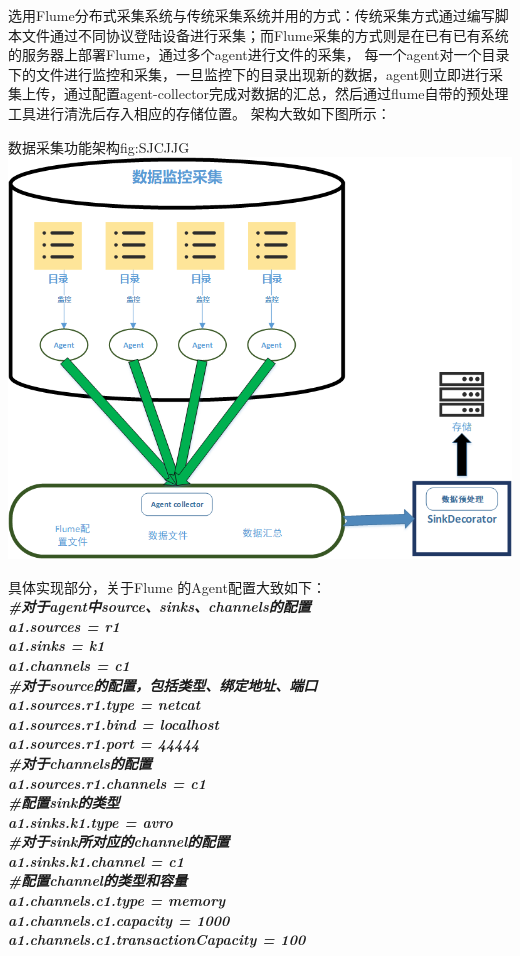 \documentclass{HustGraduPaper}
\begin{document}
    选用Flume分布式采集系统与传统采集系统并用的方式：传统采集方式通过编写脚本文件通过不同协议登陆设备进行采集；而Flume采集的方式则是在已有已有系统的服务器上部署Flume，通过多个agent进行文件的采集，
    每一个agent对一个目录下的文件进行监控和采集，一旦监控下的目录出现新的数据，agent则立即进行采集上传，通过配置agent-collector完成对数据的汇总，然后通过flume自带的预处理工具进行清洗后存入相应的存储位置。
    架构大致如下图所示：
    \clearpage
    \begin{generalfig}{数据采集功能架构}{fig:SJCJJG} 
        \includegraphics[scale = 0.7]{Figures/SJCJJG.png} 
    \end{generalfig}

    具体实现部分，关于Flume 的Agent配置大致如下：\\
    {\songti \bfseries \itshape
    \#对于agent中source、sinks、channels的配置\\
    a1.sources = r1\\
    a1.sinks = k1\\
    a1.channels = c1\\
    \#对于source的配置，包括类型、绑定地址、端口\\
    a1.sources.r1.type = netcat\\
    a1.sources.r1.bind = localhost\\
    a1.sources.r1.port = 44444\\
    \#对于channels的配置\\
    a1.sources.r1.channels = c1\\
    \#配置sink的类型\\
    a1.sinks.k1.type = avro\\
    \#对于sink所对应的channel的配置\\
    a1.sinks.k1.channel = c1\\
    \#配置channel的类型和容量\\
    a1.channels.c1.type = memory\\
    a1.channels.c1.capacity = 1000\\
    a1.channels.c1.transactionCapacity = 100
    }
\end{document}
